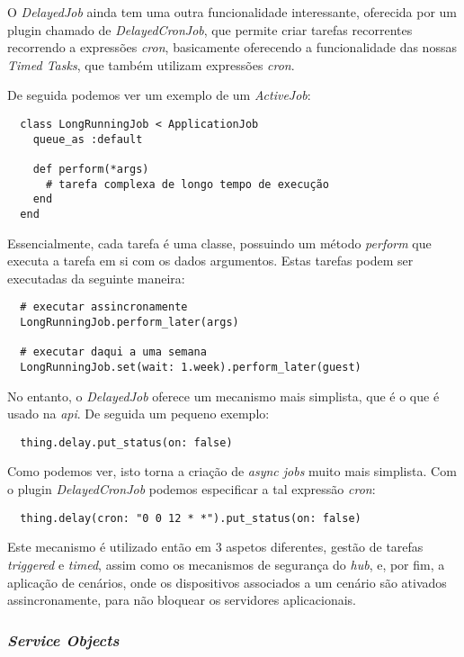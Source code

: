 O \textit{DelayedJob} ainda tem uma outra funcionalidade interessante, oferecida por um plugin chamado de \textit{DelayedCronJob}, que permite criar tarefas recorrentes recorrendo a expressões \textit{cron}, basicamente oferecendo a funcionalidade das nossas \textit{Timed Tasks}, que também utilizam expressões \textit{cron}.

De seguida podemos ver um exemplo de um \textit{ActiveJob}:

\begin{verbatim}
  class LongRunningJob < ApplicationJob
    queue_as :default
 
    def perform(*args)
      # tarefa complexa de longo tempo de execução
    end
  end
\end{verbatim}

Essencialmente, cada tarefa é uma classe, possuindo um método \textit{perform} que executa a tarefa em si com os dados argumentos. Estas tarefas podem ser executadas da seguinte maneira:

\begin{verbatim}
  # executar assincronamente
  LongRunningJob.perform_later(args)
  
  # executar daqui a uma semana
  LongRunningJob.set(wait: 1.week).perform_later(guest)
\end{verbatim}

No entanto, o \textit{DelayedJob} oferece um mecanismo mais simplista, que é o que é usado na \textit{api}. De seguida um pequeno exemplo:

\begin{verbatim}
  thing.delay.put_status(on: false)
\end{verbatim}

Como podemos ver, isto torna a criação de \textit{async jobs} muito mais simplista. Com o plugin \textit{DelayedCronJob} podemos especificar a tal expressão \textit{cron}:

\begin{verbatim}
  thing.delay(cron: "0 0 12 * *").put_status(on: false)
\end{verbatim}

Este mecanismo é utilizado então em 3 aspetos diferentes, gestão de tarefas \textit{triggered} e \textit{timed}, assim como os mecanismos de segurança do \textit{hub}, e, por fim, a aplicação de cenários, onde os dispositivos associados a um cenário são ativados assincronamente, para não bloquear os servidores aplicacionais.

\subsubsection{\textit{Service Objects}}

